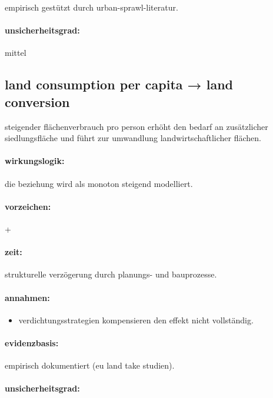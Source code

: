 \documentclass[11pt, a4paper, oneside]{scrartcl}
\begin{document}
empirisch gestützt durch urban-sprawl-literatur.

\paragraph{unsicherheitsgrad:} 

mittel


\subsection{land consumption per capita → land conversion}
steigender flächenverbrauch pro person erhöht den bedarf an zusätzlicher siedlungsfläche und führt zur umwandlung landwirtschaftlicher flächen.

\paragraph{wirkungslogik:}

die beziehung wird als monoton steigend modelliert.

\paragraph{vorzeichen:}

+

\paragraph{zeit:} 

strukturelle verzögerung durch planungs- und bauprozesse.

\paragraph{annahmen:}
\begin{itemize}
\item verdichtungsstrategien kompensieren den effekt nicht vollständig.
\end{itemize}

\paragraph{evidenzbasis:}

empirisch dokumentiert (eu land take studien).

\paragraph{unsicherheitsgrad:} 
\end{document}
